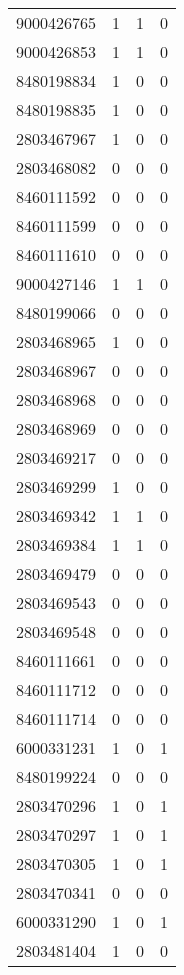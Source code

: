 \begin{tabular}[ht]{|l|c|c|c|}
9000426765  &   1   &   1   &   0   \\ 
9000426853  &   1   &   1   &   0   \\ 
8480198834  &   1   &   0   &   0   \\ 
8480198835  &   1   &   0   &   0   \\ 
2803467967  &   1   &   0   &   0   \\ 
2803468082  &   0   &   0   &   0   \\ 
8460111592  &   0   &   0   &   0   \\ 
8460111599  &   0   &   0   &   0   \\ 
8460111610  &   0   &   0   &   0   \\ 
9000427146  &   1   &   1   &   0   \\ 
8480199066  &   0   &   0   &   0   \\ 
2803468965  &   1   &   0   &   0   \\ 
2803468967  &   0   &   0   &   0   \\ 
2803468968  &   0   &   0   &   0   \\ 
2803468969  &   0   &   0   &   0   \\ 
2803469217  &   0   &   0   &   0   \\ 
2803469299  &   1   &   0   &   0   \\ 
2803469342  &   1   &   1   &   0   \\ 
2803469384  &   1   &   1   &   0   \\ 
2803469479  &   0   &   0   &   0   \\ 
2803469543  &   0   &   0   &   0   \\ 
2803469548  &   0   &   0   &   0   \\ 
8460111661  &   0   &   0   &   0   \\ 
8460111712  &   0   &   0   &   0   \\ 
8460111714  &   0   &   0   &   0   \\ 
6000331231  &   1   &   0   &   1   \\ 
8480199224  &   0   &   0   &   0   \\ 
2803470296  &   1   &   0   &   1   \\ 
2803470297  &   1   &   0   &   1   \\ 
2803470305  &   1   &   0   &   1   \\ 
2803470341  &   0   &   0   &   0   \\ 
6000331290  &   1   &   0   &   1   \\ 
2803481404  &   1   &   0   &   0   \\ 

\end{tabular}
